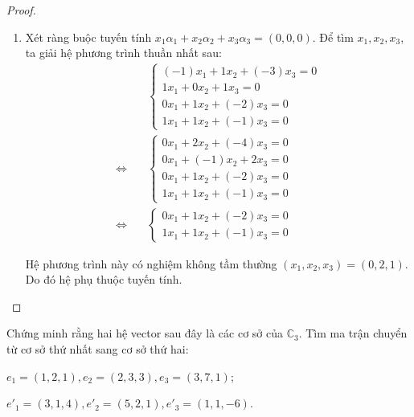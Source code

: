 \begin{proof}
\begin{enumerate}[label = (\alph*)]
              Hệ phương trình này chỉ có nghiệm tầm thường $(x_{1}, x_{2}, x_{3}, x_{4}) = (0, 0, 0, 0)$, kéo theo ràng buộc tuyến tính tầm thường. Do đó hệ độc lập tuyến tính.
        \item Xét ràng buộc tuyến tính $x_{1}\alpha_{1} + x_{2}\alpha_{2} + x_{3}\alpha_{3} = (0, 0, 0)$. Để tìm $x_{1}, x_{2}, x_{3}$, ta giải hệ phương trình thuần nhất sau:
              \begingroup
              \allowdisplaybreaks
              \begin{align*}
                                       & \begin{cases}
                                             (-1)x_{1} + 1x_{2} + (-3)x_{3} = 0 \\
                                             1x_{1} + 0x_{2} + 1x_{3} = 0       \\
                                             0x_{1} + 1x_{2} + (-2)x_{3} = 0    \\
                                             1x_{1} + 1x_{2} + (-1)x_{3} = 0
                                         \end{cases} \\
                  \Longleftrightarrow\quad &
                  \begin{cases}
                      0x_{1} + 2x_{2} + (-4)x_{3} = 0 \\
                      0x_{1} + (-1)x_{2} + 2x_{3} = 0 \\
                      0x_{1} + 1x_{2} + (-2)x_{3} = 0 \\
                      1x_{1} + 1x_{2} + (-1)x_{3} = 0
                  \end{cases}                           \\
                  \Longleftrightarrow\quad &
                  \begin{cases}
                      0x_{1} + 1x_{2} + (-2)x_{3} = 0 \\
                      1x_{1} + 1x_{2} + (-1)x_{3} = 0
                  \end{cases}
              \end{align*}
              \endgroup
              
              Hệ phương trình này có nghiệm không tầm thường $(x_{1}, x_{2}, x_{3}) = (0, 2, 1)$. Do đó hệ phụ thuộc tuyến tính.
    \end{enumerate}
\end{proof}

\begin{exercise}
    Chứng minh rằng hai hệ vector sau đây là các cơ sở của $\mathbb{C}_{3}$. Tìm ma trận chuyển từ cơ sở thứ nhất sang cơ sở thứ hai:
    \par $e_{1} = (1, 2, 1), e_{2} = (2, 3, 3), e_{3} = (3, 7, 1)$;
    \par $e'_{1} = (3, 1, 4), e'_{2} = (5, 2, 1), e'_{3} = (1, 1, -6)$.
\end{exercise}

